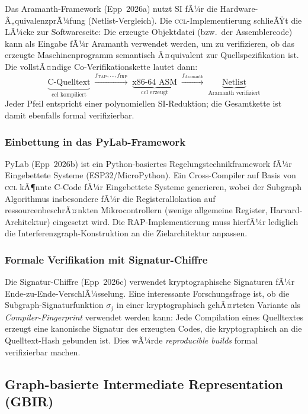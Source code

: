 ﻿\documentclass[a4paper,12pt]{article}
\theoremstyle{definition}
\begin{document}
Das Aramanth-Framework (Epp~2026a) nutzt SI fÃ¼r die
Hardware-Ã„quivalenzprÃ¼fung (Netlist-Vergleich). Die
\textsc{ccl}-Implementierung schlieÃŸt die LÃ¼cke zur Softwareseite: Die
erzeugte Objektdatei (bzw.\ der Assemblercode) kann als Eingabe fÃ¼r
Aramanth verwendet werden, um zu verifizieren, ob das erzeugte
Maschinenprogramm semantisch Ã¤quivalent zur Quellspezifikation ist.
Die vollstÃ¤ndige Co-Verifikationskette lautet dann:
\[
\underbrace{\text{C-Quelltext}}_{\text{ccl kompiliert}}
\;\xrightarrow{f_{\mathrm{TAP}}, \ldots, f_{\mathrm{IRP}}}\;
\underbrace{\text{x86-64 ASM}}_{\text{ccl erzeugt}}
\;\xrightarrow{f_{\mathrm{Aramanth}}}\;
\underbrace{\text{Netlist}}_{\text{Aramanth verifiziert}}
\]
Jeder Pfeil entspricht einer polynomiellen SI-Reduktion; die
Gesamtkette ist damit ebenfalls formal verifizierbar.

\subsubsection{Einbettung in das PyLab-Framework}

PyLab (Epp~2026b) ist ein Python-basiertes Regelungstechnikframework
fÃ¼r Eingebettete Systeme (ESP32/MicroPython). Ein
Cross-Compiler auf Basis von \textsc{ccl} kÃ¶nnte C-Code fÃ¼r
Eingebettete Systeme generieren, wobei der Subgraph Algorithmus
insbesondere fÃ¼r die Registerallokation auf ressourcenbeschrÃ¤nkten
Mikrocontrollern (wenige allgemeine Register, Harvard-Architektur)
eingesetzt wird. Die RAP-Implementierung muss hierfÃ¼r lediglich die
Interferenzgraph-Konstruktion an die Zielarchitektur anpassen.

\subsubsection{Formale Verifikation mit Signatur-Chiffre}

Die Signatur-Chiffre (Epp~2026c) verwendet kryptographische Signaturen
fÃ¼r Ende-zu-Ende-VerschlÃ¼sselung. Eine interessante Forschungsfrage
ist, ob die Subgraph-Signaturfunktion $\sigma_j$ in einer
kryptographisch gehÃ¤rteten Variante als \emph{Compiler-Fingerprint}
verwendet werden kann: Jede Compilation eines Quelltextes erzeugt
eine kanonische Signatur des erzeugten Codes, die kryptographisch
an die Quelltext-Hash gebunden ist. Dies wÃ¼rde
\emph{reproducible builds} formal verifizierbar machen.

\subsection{Graph-basierte Intermediate Representation (GBIR)}
\label{sec:ausblick-gbir}
\end{document}
